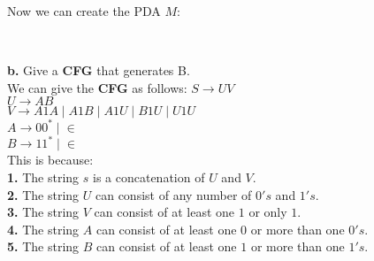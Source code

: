 \documentclass[12pt]{article}
\begin{document}
\pagebreak
Now we can create the PDA $M$:

\begin{center}
 \\
\end{center}

\textbf{b.} Give a \textbf{CFG} that generates B. \\

We can give the \textbf{CFG} as follows:
$S \rightarrow UV$ \\
$U \rightarrow AB$ \\
$V \rightarrow A1A \; | \; A1B \; | \; A1U \; | \; B1U \; | \; U1U$ \\
$A \rightarrow 00^* \; | \; \in$ \\
$B \rightarrow 11^* \; | \; \in$ \\

This is because: \\
\textbf{1.} The string $s$ is a concatenation of $U$ and $V$. \\
\textbf{2.} The string $U$ can consist of any number of $0's$ and $1's$. \\
\textbf{3.} The string $V$ can consist of at least one $1$ or only $1$.\\
\textbf{4.} The string $A$ can consist of at least one $0$ or more than one $0's$. \\
\textbf{5.} The string $B$ can consist of at least one $1$ or more than one $1's$. \\
\end{document}

